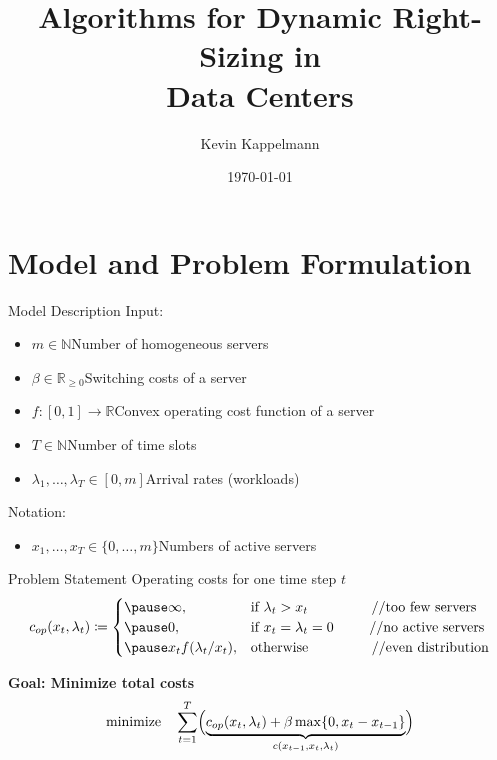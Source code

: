 \documentclass{beamer}
\title{Algorithms for Dynamic Right-Sizing in\\Data Centers} %
\author{Kevin Kappelmann} %
\institute[TUM]{Technical University of Munich}
\date{\today} %
\newcommand{\costs}{c}
\newcommand{\opcosts}{c_{op}}
\newcommand{\fromto}[2]{\{#1,\dotsc,#2\}}
\begin{document}
\maketitle

\section{Model and Problem Formulation}
\begin{frame}{Model Description}
Input:
\begin{itemize}[<+->]
  \item $m\in\mathbb{N}$\dotso Number of homogeneous servers 
  \item $\beta\in\mathbb{R}_{\ge 0}$\dotso Switching costs of a server
  \item $f:[0,1]\rightarrow\mathbb{R}$\dotso Convex operating cost function of a server
  \item $T\in\mathbb{N}$\dotso Number of time slots
  \item $\lambda_1,\dotsc,\lambda_{T}\in[0,m]$\dotso Arrival rates (workloads)
\end{itemize}
\pause[\thebeamerpauses]
Notation:
\begin{itemize}
	\item $x_1,\dotsc,x_{T}\in\fromto{0}{m}$\dotso Numbers of active servers
\end{itemize}
\end{frame}
\begin{frame}{Problem Statement}
Operating costs for one time step $t$
\begin{equation*}
	\opcosts(x_t,\lambda_t)\coloneqq\begin{cases}
	  \pause\infty, & \text{if $\lambda_t>x_t$}\hspace{16mm}\text{//too few servers}\\
          \pause 0, & \text{if $x_t=\lambda_t=0$\hspace{9mm}\text{//no active servers}}\\
	  \pause x_tf(\lambda_t/x_t), & \text{otherwise}\hspace{16mm}\text{//even distribution}
	  \end{cases}
\end{equation*}
\pause
\begin{alertbox}
\centering \textbf{Goal: Minimize total costs}
\begin{align*}
	\text{minimize}\quad \sum\limits_{t=1}^{T}\Bigl(\underbrace{\opcosts(x_t,\lambda_t)+\beta\max\{0,x_t-x_{t-1}\}}_{\costs(x_{t-1},x_t,\lambda_t)}\Bigr)
\end{align*}
\end{alertbox}
\end{frame}
\end{document}

